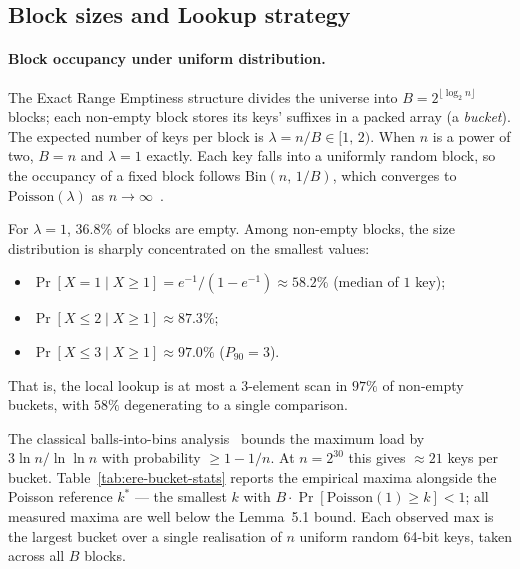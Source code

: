 \subsection{Block sizes and Lookup strategy}
\label{subsec:block-sizes-and-lookup-strategy}

\paragraph{Block occupancy under uniform distribution.}
The Exact Range Emptiness structure divides the universe into $B = 2^{\lfloor \log_2 n \rfloor}$ blocks;
each non-empty block stores its keys' suffixes in a packed array (a \emph{bucket}).
The expected
number of keys per block is $\lambda = n/B \in [1,\,2)$.
When $n$ is a power of two, $B = n$ and $\lambda = 1$ exactly.
Each key falls into a uniformly random block, so the occupancy of a fixed block
follows $\mathrm{Bin}(n,\,1/B)$, which converges to $\mathrm{Poisson}(\lambda)$
as $n \to \infty$~\citep[Ch.~5]{mitzenmacher2017probability}.

For $\lambda = 1$, $36.8\%$ of blocks are empty. Among non-empty blocks,
the size distribution is sharply concentrated on the smallest values:
\begin{itemize}
    \item $\Pr[X = 1 \mid X \geq 1] = e^{-1}/(1 - e^{-1}) \approx 58.2\%$
        (median of $1$ key);
    \item $\Pr[X \leq 2 \mid X \geq 1] \approx 87.3\%$;
    \item $\Pr[X \leq 3 \mid X \geq 1] \approx 97.0\%$ ($P_{90} = 3$).
\end{itemize}
That is, the local lookup is at most a $3$-element scan in $97\%$ of
non-empty buckets, with $58\%$ degenerating to a single comparison.

The classical balls-into-bins analysis~\citep[Lemma~5.1]{mitzenmacher2017probability}
bounds the maximum load by $3\ln n / \ln\ln n$ with probability $\geq 1 - 1/n$.
At $n = 2^{30}$ this gives $\approx 21$ keys per bucket.
Table~\ref{tab:ere-bucket-stats} reports the empirical maxima alongside the
Poisson reference $k^*$ --- the smallest $k$ with $B \cdot \Pr[\mathrm{Poisson}(1) \geq k] < 1$;
all measured maxima are well below the Lemma~5.1 bound.
Each observed max is the largest bucket over a single realisation of $n$ uniform
random 64-bit keys, taken across all $B$ blocks.

